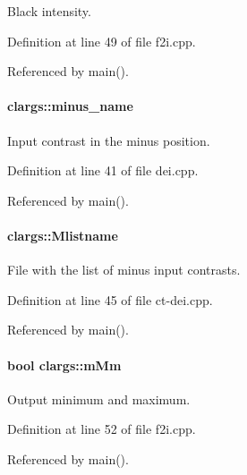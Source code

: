 Black intensity. 



Definition at line 49 of file f2i.cpp.



Referenced by main().

\hypertarget{structclargs_af4d7f13b75bcc0643896d80c7da1e953}{
\paragraph[{minus\_\-name}]{ {\bf clargs::minus\_\-name}}\hfill}
\label{structclargs_af4d7f13b75bcc0643896d80c7da1e953}


Input contrast in the minus position. 



Definition at line 41 of file dei.cpp.



Referenced by main().

\hypertarget{structclargs_acca6e360a1db6b735f6b1689fb7b4a13}{
\paragraph[{Mlistname}]{ {\bf clargs::Mlistname}}\hfill}
\label{structclargs_acca6e360a1db6b735f6b1689fb7b4a13}


File with the list of minus input contrasts. 



Definition at line 45 of file ct-\/dei.cpp.



Referenced by main().

\hypertarget{structclargs_ad4ca5e72b43d31b3275721a53611149d}{
\paragraph[{mMm}]{\setlength{\rightskip}{0pt plus 5cm}bool {\bf clargs::mMm}}\hfill}
\label{structclargs_ad4ca5e72b43d31b3275721a53611149d}
Output minimum and maximum. 

Definition at line 52 of file f2i.cpp.



Referenced by main().

